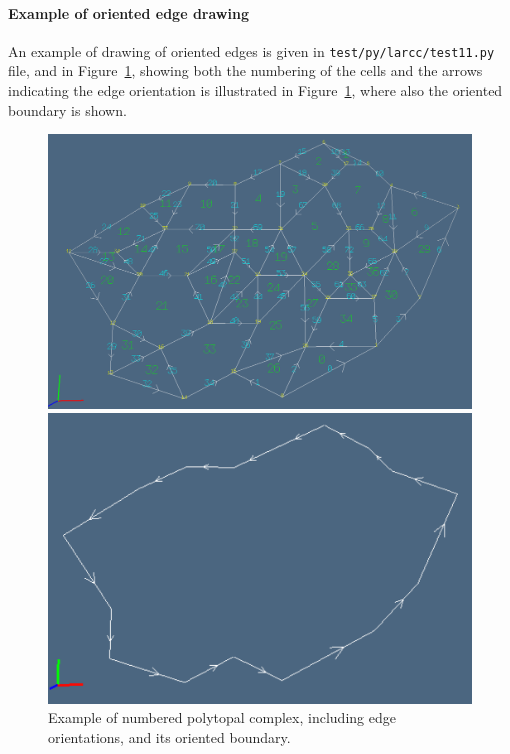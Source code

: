 \documentclass[11pt,oneside]{article}    %
\begin{document}
\paragraph{Example of oriented edge drawing}
An example of drawing of oriented edges is given in \texttt{test/py/larcc/test11.py} file, and in Figure~\ref{numberedcomplex}, showing both the numbering of the cells and the arrows indicating the edge orientation is illustrated in Figure~\ref{numberedcomplex}, where also the oriented boundary is shown.

\begin{figure}[htbp] %
   \centering
   \includegraphics[width=0.9\linewidth]{images/numberedcomplex} 
   
   \includegraphics[width=0.9\linewidth]{images/numberedcomplex1} 
   \caption{Example of numbered polytopal complex, including edge orientations, and its oriented boundary.}
   \label{numberedcomplex}
\end{figure}
\end{document}
